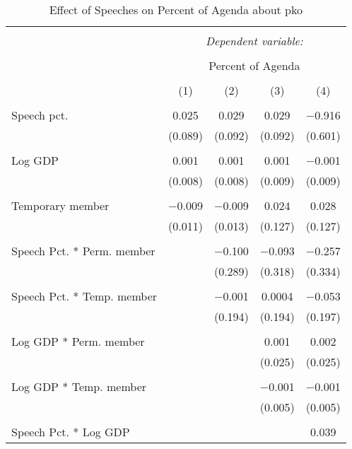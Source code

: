 
\begin{table}[!htbp] \centering 
  \caption{Effect of Speeches on Percent of Agenda about  pko} 
  \label{} 
\begin{tabular}{@{\extracolsep{5pt}}lcccc} 
\\[-1.8ex]\hline 
\hline \\[-1.8ex] 
 & \multicolumn{4}{c}{\textit{Dependent variable:}} \\ 
\cline{2-5} 
\\[-1.8ex] & \multicolumn{4}{c}{Percent of Agenda} \\ 
\\[-1.8ex] & (1) & (2) & (3) & (4)\\ 
\hline \\[-1.8ex] 
 Speech pct. & 0.025 & 0.029 & 0.029 & $-$0.916 \\ 
  & (0.089) & (0.092) & (0.092) & (0.601) \\ 
  & & & & \\ 
 Log GDP & 0.001 & 0.001 & 0.001 & $-$0.001 \\ 
  & (0.008) & (0.008) & (0.009) & (0.009) \\ 
  & & & & \\ 
 Temporary member & $-$0.009 & $-$0.009 & 0.024 & 0.028 \\ 
  & (0.011) & (0.013) & (0.127) & (0.127) \\ 
  & & & & \\ 
 Speech Pct. * Perm. member &  & $-$0.100 & $-$0.093 & $-$0.257 \\ 
  &  & (0.289) & (0.318) & (0.334) \\ 
  & & & & \\ 
 Speech Pct. * Temp. member &  & $-$0.001 & 0.0004 & $-$0.053 \\ 
  &  & (0.194) & (0.194) & (0.197) \\ 
  & & & & \\ 
 Log GDP * Perm. member &  &  & 0.001 & 0.002 \\ 
  &  &  & (0.025) & (0.025) \\ 
  & & & & \\ 
 Log GDP * Temp. member &  &  & $-$0.001 & $-$0.001 \\ 
  &  &  & (0.005) & (0.005) \\ 
  & & & & \\ 
 Speech Pct. * Log GDP &  &  &  & 0.039 \\ 

\end{tabular}
\end{table}
